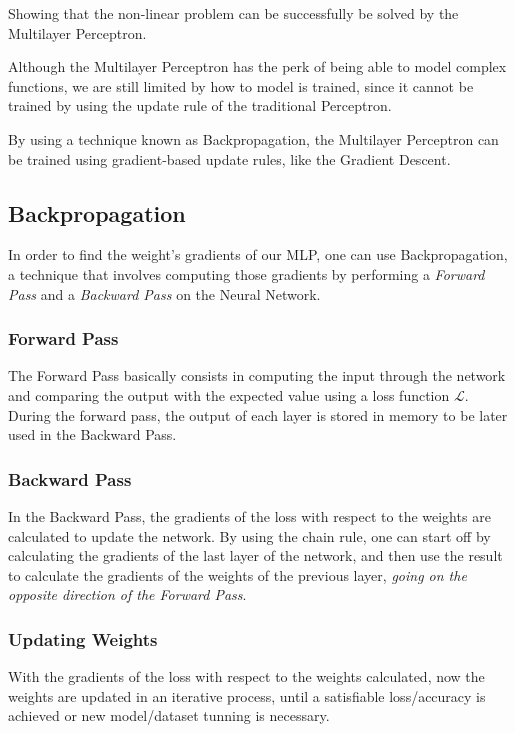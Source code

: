 \noindent Showing that the non-linear problem can be successfully be solved by the Multilayer Perceptron.

Although the Multilayer Perceptron has the perk of being able to model complex functions, we are still limited by how to model is trained, since it cannot be trained by using the update rule of the traditional Perceptron.

By using a technique known as Backpropagation, the Multilayer Perceptron can be trained using gradient-based update rules, like the Gradient Descent.

\subsection{Backpropagation}

In order to find the weight's gradients of our MLP, one can use Backpropagation, a technique that involves computing those gradients by performing a \emph{Forward Pass} and a \emph{Backward Pass} on the Neural Network.

\subsubsection{Forward Pass}

The Forward Pass basically consists in computing the input through the network and comparing the output with the expected value using a loss function \(\mathcal{L}\).
During the forward pass, the output of each layer is stored in memory to be later used in the Backward Pass.

\subsubsection{Backward Pass}

In the Backward Pass, the gradients of the loss with respect to the weights are calculated to update the network. 
By using the chain rule, one can start off by calculating the gradients of the last layer of the network, and then use the result to calculate the gradients of the weights of the previous layer, \emph{going on the opposite direction of the Forward Pass}.

\subsubsection{Updating Weights}

With the gradients of the loss with respect to the weights calculated, now the weights are updated in an iterative process, until a satisfiable loss/accuracy is achieved or new model/dataset tunning is necessary. 

